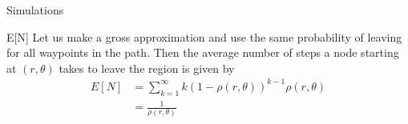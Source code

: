 \documentclass{beamer}
\begin{document}
\begin{frame}{Simulations} {}


\begin{figure}[H]
     \begin{center}
%

%
    \end{center}
\end{figure}

\end{frame}

\begin{frame}{E[N]}
Let us make a gross approximation and use the same probability of leaving for all waypoints
in the path. Then the average number of steps a node starting at $(r,\theta)$ takes to leave the region is given by
\begin{align*}
	E[N] &= \sum_{k=1}^{\infty} k(1-\rho(r,\theta))^{k-1} \rho(r,\theta) \\[2ex]
	&= \frac{1}{\rho(r,\theta)}
\end{align*}
\end{frame}
\end{document}
